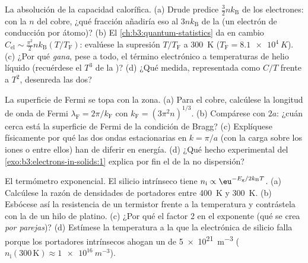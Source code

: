 \begin{exercise}[$\star\star$]\label{exo:b3:electrons-in-solids:6}
La absolución de la capacidad calorífica. (a) Drude predice
$\tfrac32nk_{\text{B}}$ de los electrones: con la $n$ del cobre,
¿qué fracción añadiría eso al $3nk_{\text{B}}$ de la
 (un electrón de conducción por átomo)? (b)
El \cref{ch:b3:quantum-statistics} da en cambio $C_{\text{el}}
\sim \tfrac{\pi^2}{2}nk_{\text{B}}(T/T_{\text{F}})$: evalúese la
supresión $T/T_{\text{F}}$ a \qty{300}{K}
($T_{\text{F}} = \qty{8.1e4}{K}$). (c) ¿Por qué \emph{gana}, pese a todo, el término
electrónico a temperaturas de helio líquido
(recuérdese el $T^3$ de la )? (d) ¿Qué medida, representada como
$C/T$ frente a $T^2$, desenreda las dos?
\end{exercise}

\begin{exercise}[$\star\star$]\label{exo:b3:electrons-in-solids:7}
La superficie de Fermi se topa con la zona. (a) Para el cobre, calcúlese la
longitud de onda de Fermi $\lambda_{\text{F}} = 2\pi/k_{\text{F}}$ con
$k_{\text{F}} = (3\pi^2n)^{1/3}$. (b) Compárese con $2a$: ¿cuán
cerca está la superficie de Fermi de la condición de Bragg? (c) Explíquese
físicamente por qué las dos ondas estacionarias en $k = \pi/a$ (con la carga sobre
los iones o entre ellos) han de diferir en energía. (d) ¿Qué
hecho experimental del \cref{exo:b3:electrons-in-solids:1} explica
por fin el  de la no dispersión?
\end{exercise}

\begin{exercise}[$\star\star$]\label{exo:b3:electrons-in-solids:8}
El termómetro exponencial. El silicio intrínseco tiene $n_{\text{i}}
\propto \eu^{-E_{\text{g}}/2k_{\text{B}}T}$. (a) Calcúlese la
razón de densidades de portadores entre \qty{400}{K} y \qty{300}{K}. (b)
Esbócese así la resistencia de un termistor frente a la temperatura y
contrástela con la de un hilo de platino. (c) ¿Por qué el factor 2 en el
exponente (qué se crea \emph{por parejas})? (d) Estímese la
temperatura a la que la electrónica de silicio falla porque los portadores
intrínsecos ahogan un  de \qty{5e21}{m^{-3}}
($n_{\text{i}}(300\,\text{K}) \approx \qty{1e16}{m^{-3}}$).
\end{exercise}

